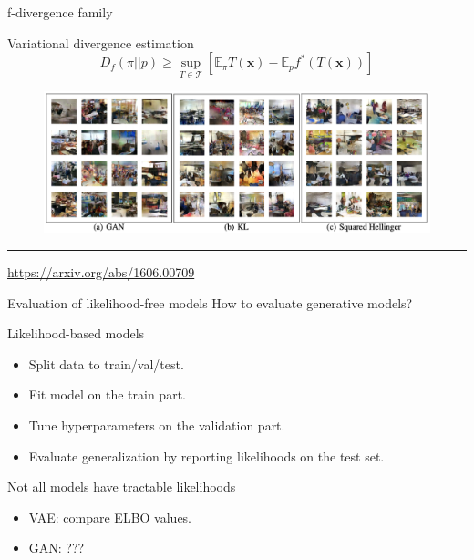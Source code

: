 \documentclass{beamer}
\newcommand{\bx}{\mathbf{x}}
\newcommand{\bbE}{\mathbb{E}}
\newcommand{\cT}{\mathcal{T}}
\begin{document}
\begin{frame}{f-divergence family}
	\begin{block}{Variational divergence estimation}
		\[
			D_f(\pi || p) \geq \sup_{T \in \cT} \left[\bbE_{\pi}T(\bx) -  \bbE_p f^*(T(\bx)) \right]
		\]
	\end{block}
	\begin{figure}
		\centering
		\includegraphics[width=1.0\linewidth]{figs/f_div_results}
	\end{figure}
	\vfill
	\hrule\medskip 
	{\scriptsize \href{https://arxiv.org/abs/1606.00709}{https://arxiv.org/abs/1606.00709}}
\end{frame}
\begin{frame}{Evaluation of likelihood-free models}
	How to evaluate generative models?
	\begin{block}{Likelihood-based models}
		\begin{itemize}
			\item Split data to train/val/test.
			\item Fit model on the train part.
			\item Tune hyperparameters on the validation part.
			\item Evaluate generalization by reporting likelihoods on the test set.
		\end{itemize}
	\end{block}
	\begin{block}{Not all models have tractable likelihoods}
		\begin{itemize}
			\item VAE: compare ELBO values.
			\item GAN: ???
		\end{itemize}
	\end{block}
\end{frame}
\end{document}
